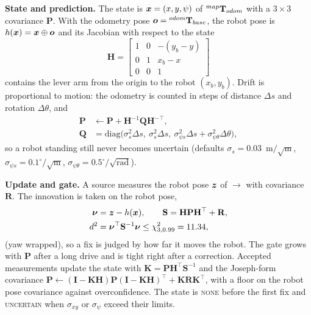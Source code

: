 \textbf{State and prediction.} The state is $\boldsymbol{x} = (x, y, \psi)$ of ${}^{map}\mathbf{T}_{odom}$ with a
$3\times3$ covariance $\mathbf{P}$. With the odometry pose $\boldsymbol{o} = {}^{odom}\mathbf{T}_{base}$, the
robot pose is $h(\boldsymbol{x}) = \boldsymbol{x} \oplus \boldsymbol{o}$ and its Jacobian with respect to the state
\begin{equation}
  \mathbf{H} = \begin{bmatrix} 1 & 0 & -(y_b - y) \\ 0 & 1 & x_b - x \\ 0 & 0 & 1 \end{bmatrix}
\end{equation}
contains the lever arm from the  origin to the robot $(x_b, y_b)$. Drift is
proportional to motion: the odometry is counted in steps of distance $\Delta s$ and rotation
$\Delta\theta$, and
\begin{equation}
  \begin{aligned}
    \mathbf{P} &\leftarrow \mathbf{P} + \mathbf{H}^{-1} \mathbf{Q} \mathbf{H}^{-\top},\\
    \mathbf{Q} &= \mathrm{diag}\big(\sigma_{s}^2 \Delta s,\ \sigma_{s}^2 \Delta s,\
    \sigma_{\psi s}^2 \Delta s + \sigma_{\psi\theta}^2 \Delta\theta\big),
  \end{aligned}
\end{equation}
so a robot standing still never becomes uncertain (defaults $\sigma_s = 0.03$~m$/\sqrt{\mathrm{m}}$,
$\sigma_{\psi s} = 0.1^\circ/\sqrt{\mathrm{m}}$, $\sigma_{\psi\theta} = 0.5^\circ/\sqrt{
\mathrm{rad}}$).

\textbf{Update and gate.} A source measures the robot pose $\boldsymbol{z}$ of $\to$
\frm{base\_link} with covariance $\mathbf{R}$. The innovation is taken on the robot pose,
\begin{equation}
  \begin{aligned}
    \boldsymbol{\nu} &= \boldsymbol{z} - h(\boldsymbol{x}), \qquad \mathbf{S} = \mathbf{H}\mathbf{P}\mathbf{H}^\top
    + \mathbf{R},\\
    d^2 &= \boldsymbol{\nu}^\top \mathbf{S}^{-1} \boldsymbol{\nu} \le \chi^2_{3,0.99} = 11.34,
  \end{aligned}
  \label{eq:gate}
\end{equation}
(yaw wrapped), so a fix is judged by how far it moves the robot. The gate grows with
$\mathbf{P}$ after a long drive and is tight right after a correction. Accepted measurements
update the state with $\mathbf{K} = \mathbf{P}\mathbf{H}^\top\mathbf{S}^{-1}$ and the
Joseph-form covariance $\mathbf{P} \leftarrow (\mathbf{I}-\mathbf{K}\mathbf{H})\mathbf{P}
(\mathbf{I}-\mathbf{K}\mathbf{H})^\top + \mathbf{K}\mathbf{R}\mathbf{K}^\top$, with a floor on
the robot pose covariance against overconfidence. The state is \textsc{none} before the first
fix and \textsc{uncertain} when $\sigma_{xy}$ or $\sigma_\psi$ exceed their limits.

